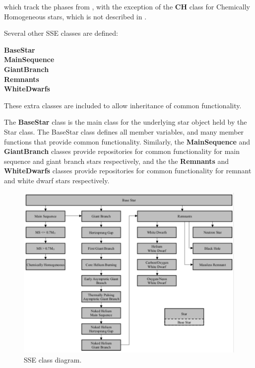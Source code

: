which track the phases from \citet{Hurley_2000}, with the exception of the \textbf{CH} class for Chemically Homogeneous stars, which is not described in \citet{Hurley_2000}.

Several other SSE classes are defined:

\bigskip
\hfill
\begin{minipage}{\dimexpr\textwidth-2em}
    \textbf{BaseStar} \\
    \textbf{MainSequence} \\
    \textbf{GiantBranch} \\
    \textbf{Remnants} \\
    \textbf{WhiteDwarfs}
\end{minipage}
 
\bigskip
These extra classes are included to allow inheritance of common functionality.

The \textbf{BaseStar} class is the main class for the underlying star object held by the Star class.  The BaseStar class defines all member variables, and many member functions that provide common functionality.  Similarly, the \textbf{MainSequence} and \textbf{GiantBranch} classes provide repositories for common functionality for main sequence and giant branch stars respectively, and the the \textbf{Remnants} and \textbf{WhiteDwarfs} classes provide repositories for common functionality for remnant and white dwarf stars respectively.

\begin{figure}
    \begin{center}
	    \includegraphics[viewport = 0 0 535 405, width = 13.65cm, clip]{sections/images/SSE_ClassDiagram.pdf}
    \end{center}
    \vspace{-2.00mm}
    \caption{SSE class diagram.}
    \label{fig:SSE_ClassDiagram}
\end{figure}


